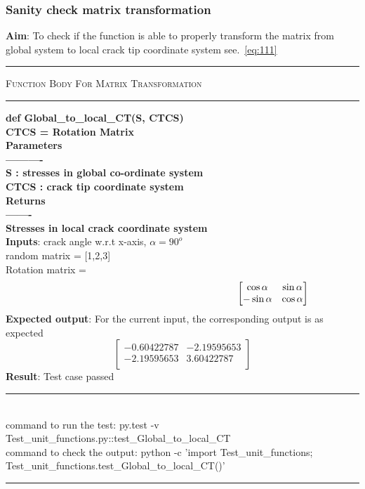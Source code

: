 \documentclass[fleqn, 12.5pt,a4paper]{report}
\begin{document}
\subsubsection{Sanity check matrix transformation}
\textbf{Aim}: To check if the function is able to properly transform the matrix from global system to local crack tip coordinate system see.~\autoref{eq:111}\newline
{ \rule{\linewidth}{0.05cm}}
	{\scshape Function Body For Matrix Transformation}\\
{ \rule{\linewidth}{0.05cm}}
{\selectfont
\textbf{def Global{\_}to{\_}local{\_}CT(S, CTCS)\\
    CTCS = Rotation Matrix\\
    Parameters\\
    ----------\\
    S : stresses in global co-ordinate system\\
    CTCS : crack tip coordinate system\\
    Returns\\
    -------\\
    Stresses in local crack coordinate system\\
    }}
\textbf{Inputs}: crack angle w.r.t x-axis, $\alpha = 90^o$\\ 
random matrix = [1,2,3]\\
Rotation matrix = 
\begin{align}\label{eq:111}\hspace{6.5cm}
\begin{bmatrix}
\cos\alpha & \sin\alpha\\
-\sin\alpha & \cos\alpha\\
\end{bmatrix}
\end{align}
\textbf{Expected output}: For the current input, the corresponding output is as expected  
 $$ 
\begin{bmatrix}
-0.60422787 & -2.19595653\\
-2.19595653 & 3.60422787\\
\end{bmatrix}
$$
\textbf{Result}: Test case passed
\\
{\rule{\linewidth}{0.02cm}}\\
command to run the test: {\selectfont py.test -v Test{\_}unit{\_}functions.py::test{\_}Global{\_}to{\_}local{\_}CT}\\
command to check the output: {\selectfont python -c  'import Test{\_}unit{\_}functions;\\
Test{\_}unit{\_}functions.test{\_}Global{\_}to{\_}local{\_}CT()'}\\
{\rule{\linewidth}{0.02cm}}
\end{document}
